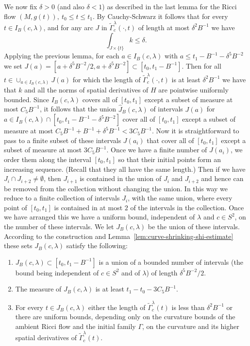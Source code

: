 We now fix $\delta>0$ (and also $\delta<1$) as described in the last
lemma for the Ricci flow  $(M,g(t)),\ t_0\le t\le t_1$. By
Cauchy-Schwarz it follows that for every $t\in I_B(c,\lambda)$,
  and for any arc $J$ in $\widetilde\Gamma_c^\lambda(\cdot,t)$ of
length at most $\delta^2B^{-1}$ we have
$$\int_{J\times\{t\}}k\le \delta.$$
Applying the previous lemma,  for each $a\in I_B(c,\lambda)$ with
$a\le t_1-B^{-1}-\delta^5B^{-2}$ we set
$J(a)=[a+\delta^5B^{-2}/2,a+\delta^5B^{-2}]\subset
[t_0,t_1-B^{-1}]$. Then for all $t\in \cup_{a\in
I_B(c,\lambda)}J(a)$ for which the length of $\widetilde
\Gamma_c^\lambda(\cdot,t)$ is at least $\delta^2B^{-1}$ we have that
$k$ and all the norms of spatial derivatives of $H$ are pointwise
uniformly bounded. Since $I_B(c,\lambda)$ covers all of $[t_0,t_1]$
except a subset of measure at most $C_5B^{-1}$, it follows that the
union $\widehat J_B(c,\lambda)$ of intervals $J(a)$ for $a\in
I_B(c,\lambda)\cap [t_0,t_1-B^{-1}-\delta^5B^{-2}]$ cover all of
$[t_0,t_1]$ except a subset of measure at most
$C_5B^{-1}+B^{-1}+\delta^5B^{-1}<3C_5B^{-1}$. Now it is
straightforward to pass to a finite subset of these intervals
$J(a_i)$ that cover all of $[t_0,t_1]$ except a subset of measure at
most $3C_5B^{-1}$.
 Once we
have a finite number of $J(a_i)$, we order them along the interval
$[t_0,t_1]$ so that  their initial points form an increasing
sequence. (Recall that they all have the same length.) Then if we
have $J_i\cap J_{i+2}\not=\emptyset$, then $J_{i+1}$ is contained in
the union of $J_i$ and $J_{i+2}$ and hence can be removed from the
collection without changing the union. In this way we reduce to a
finite collection of intervals $J_i$, with the same union, where
every point of $[t_0,t_1]$ is contained in at most $2$ of the
intervals in the collection. Once we have arranged this we have a
uniform bound, independent of $\lambda$ and $c\in S^2$, on the
number of these intervals. We let $J_B(c,\lambda)$ be the union of
these intervals. According to the construction and Lemma~\ref{lem:curve-shrinking-shi-estimate}
these sets $J_B(c,\lambda)$ satisfy the following:
\begin{enumerate}
\item[(1)] $J_B(c,\lambda)\subset [t_0,t_1-B^{-1}]$ is a union of a bounded number of intervals
(the bound being independent of $c\in S^2$ and of $\lambda$) of
length $\delta^5B^{-2}/2$.
\item[(2)] The measure of $J_B(c,\lambda)$ is at least
$t_1-t_0-3C_5B^{-1}$.
\item[(3)] For every $t\in J_B(c,\lambda)$ either the length of $\widetilde\Gamma_c^\lambda(t)$ is
less than $\delta^2 B^{-1}$ or there are uniform bounds, depending
only on the curvature bounds of the ambient Ricci flow and the
initial family $\Gamma$, on the curvature and its higher spatial
derivatives of $\widetilde\Gamma_c^\lambda(t)$.
\end{enumerate}


